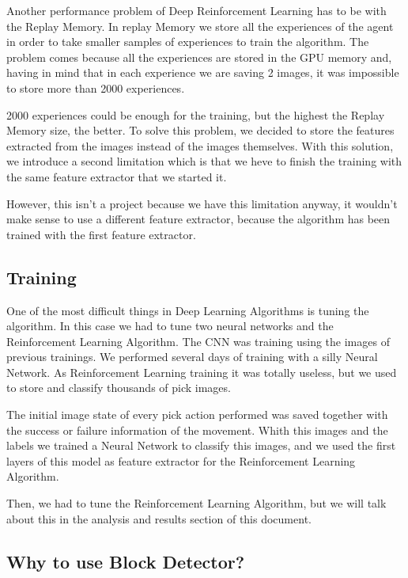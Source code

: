 			Another performance problem of Deep Reinforcement Learning has to be with the Replay Memory. In replay Memory we store all the experiences of the agent in order to take smaller samples of experiences to train the algorithm. The problem comes because all the experiences are stored in the GPU memory and, having in mind that in each experience we are saving 2 images, it was impossible to store more than 2000 experiences.
			
			2000 experiences could be enough for the training, but the highest the Replay Memory size, the better. To solve this problem, we decided to store the features extracted from the images instead of the images themselves. With this solution, we introduce a second limitation which is that we heve to finish the training with the same feature extractor that we started it.
			
			However, this isn't a project because we have this limitation anyway, it wouldn't make sense to use a different feature extractor, because the algorithm has been trained with the first feature extractor.
		
		\subsection{Training}
			
			One of the most difficult things in Deep Learning Algorithms is tuning the algorithm. In this case we had to tune two neural networks and the Reinforcement Learning Algorithm. The CNN was training using the images of previous trainings. We performed several days of training with a silly Neural Network. As Reinforcement Learning training it was totally useless, but we used to store and classify thousands of pick images.
			
			The initial image state of every pick action performed was saved together with the success or failure information of the movement. Whith this images and the labels we trained a Neural Network to classify this images, and we used the first layers of this model as feature extractor for the Reinforcement Learning Algorithm.
			
			Then, we had to tune the Reinforcement Learning Algorithm, but we will talk about this in the analysis and results section of this document.
			
		\subsection{Why to use Block Detector?}


